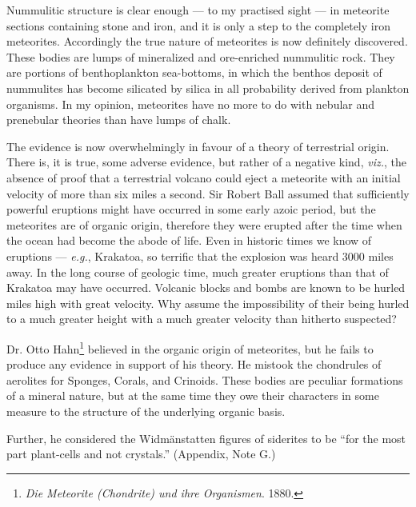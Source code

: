\documentclass[a4paper, 12pt, oneside, landscape]{article}
\begin{document}
Nummulitic structure is clear enough --- to my practised sight --- in meteorite sections containing stone and iron, and it is only a step to the completely iron meteorites. Accordingly the true nature of meteorites is now definitely discovered. These bodies are lumps of mineralized and ore-enriched nummulitic rock. They are portions of benthoplankton sea-bottoms, in which the benthos deposit of nummulites has become silicated by silica in all probability derived from plankton organisms. In my opinion, meteorites have no more to do with nebular and prenebular theories than have lumps of chalk.

The evidence is now overwhelmingly in favour of a theory of terrestrial origin. There is, it is true, some adverse evidence, but rather of a negative kind, \emph{viz.}, the absence of proof that a terrestrial volcano could eject a meteorite with an initial velocity of more than six miles a second. Sir Robert Ball assumed that sufficiently powerful eruptions might have occurred in some early azoic period, but the meteorites are of organic origin, therefore they were erupted after the time when the ocean had become the abode of life. Even in historic times we know of eruptions --- \emph{e.g.}, Krakatoa, so terrific that the explosion was heard 3000 miles away. In the long course of geologic time, much greater eruptions than that of Krakatoa may have occurred. Volcanic blocks and bombs are known to be hurled miles high with great velocity. Why assume the impossibility of their being hurled to a much greater height with a much greater velocity than hitherto suspected?

Dr. Otto Hahn\footnote{\emph{Die Meteorite (Chondrite) und ihre Organismen}. 1880.} believed in the organic origin of meteorites, but he fails to produce any evidence in support of his theory. He mistook the chondrules of aerolites for Sponges, Corals, and Crinoids. These bodies are peculiar formations of a mineral nature, but at the same time they owe their characters in some measure to the structure of the underlying organic basis.

Further, he considered the Widmänstatten figures of siderites to be ``for the most part plant-cells and not crystals.'' (Appendix, Note G.)
\end{document}
